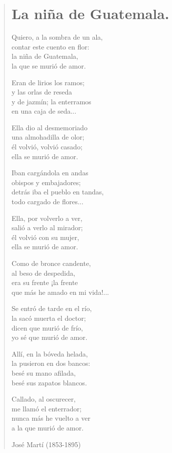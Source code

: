 \documentclass[12pt, twoside]{book}
\begin{document}
\newpage
\begin{verse}
\begin{center}
\section{La niña de Guatemala.}
\end{center}
Quiero, a la sombra de un ala,\\
contar este cuento en flor:\\
la niña de Guatemala,\\
la que se murió de amor.
\newline

Eran de lirios los ramos;\\
y las orlas de reseda\\
y de jazmín; la enterramos\\
en una caja de seda...
\newline

Ella dio al desmemoriado\\
una almohadilla de olor;\\
él volvió, volvió casado;\\
ella se murió de amor.
\newline

Iban cargándola en andas\\
obispos y embajadores;\\
detrás iba el pueblo en tandas,\\
todo cargado de flores...
\newline

Ella, por volverlo a ver,\\
salió a verlo al mirador;\\
él volvió con su mujer,\\
ella se murió de amor.
\newline

Como de bronce candente,\\
al beso de despedida,\\
era su frente ¡la frente\\
que más he amado en mi vida!...
\newpage

Se entró de tarde en el río,\\
la sacó muerta el doctor;\\
dicen que murió de frío,\\
yo sé que murió de amor.
\newline

Allí, en la bóveda helada,\\
la pusieron en dos bancos:\\
besé su mano afilada,\\
besé sus zapatos blancos.
\newline

Callado, al oscurecer,\\
me llamó el enterrador;\\
nunca más he vuelto a ver\\
a la que murió de amor.
\newline

José Martí (1853-1895)
\end{verse}
\end{document}
